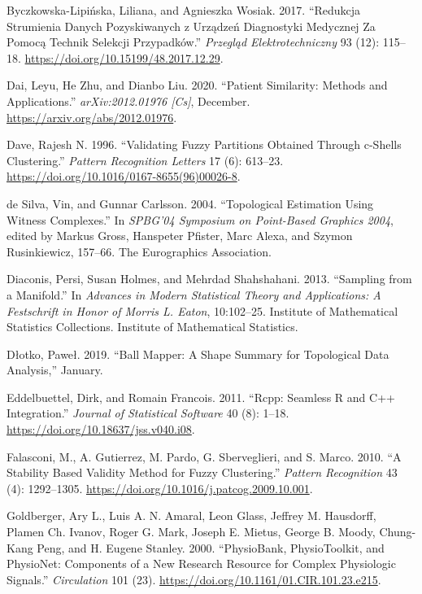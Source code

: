 \documentclass{article}
\newlength{\cslhangindent}
\newlength{\cslentryspacingunit} %
\newenvironment{CSLReferences}[2] %
 {%
  \setlength{\parindent}{0pt}
  \ifodd #1
  \let\oldpar\par
  \def\par{\hangindent=\cslhangindent\oldpar}
  \fi
  \setlength{\parskip}{#2\cslentryspacingunit}
 }%
 {}
\begin{document}
\begin{CSLReferences}{1}{0}
\leavevmode{}%
Byczkowska-Lipińska, Liliana, and Agnieszka Wosiak. 2017. {``Redukcja
Strumienia Danych Pozyskiwanych z Urządzeń Diagnostyki Medycznej Za
Pomocą Technik Selekcji Przypadków.''} \emph{Przegląd Elektrotechniczny}
93 (12): 115--18. \url{https://doi.org/10.15199/48.2017.12.29}.

\leavevmode{}%
Dai, Leyu, He Zhu, and Dianbo Liu. 2020. {``Patient Similarity: Methods
and Applications.''} \emph{arXiv:2012.01976 {[}Cs{]}}, December.
\url{https://arxiv.org/abs/2012.01976}.

\leavevmode{}%
Dave, Rajesh N. 1996. {``Validating Fuzzy Partitions Obtained Through
c-Shells Clustering.''} \emph{Pattern Recognition Letters} 17 (6):
613--23. \url{https://doi.org/10.1016/0167-8655(96)00026-8}.

\leavevmode{}%
de Silva, Vin, and Gunnar Carlsson. 2004. {``Topological Estimation
Using Witness Complexes.''} In \emph{{SPBG}'04 {Symposium} on
{Point-Based Graphics} 2004}, edited by Markus Gross, Hanspeter Pfister,
Marc Alexa, and Szymon Rusinkiewicz, 157--66. {The Eurographics
Association}.

\leavevmode{}%
Diaconis, Persi, Susan Holmes, and Mehrdad Shahshahani. 2013.
{``Sampling from a {Manifold}.''} In \emph{Advances in {Modern
Statistical Theory} and {Applications}: {A Festschrift} in Honor of
{Morris L}. {Eaton}}, 10:102--25. Institute of {Mathematical Statistics
Collections}. {Institute of Mathematical Statistics}.

\leavevmode{}%
Dłotko, Paweł. 2019. {``Ball Mapper: A Shape Summary for Topological
Data Analysis,''} January.

\leavevmode{}%
Eddelbuettel, Dirk, and Romain Francois. 2011. {``Rcpp: {Seamless R} and
{C}++ {Integration}.''} \emph{Journal of Statistical Software} 40 (8):
1--18. \url{https://doi.org/10.18637/jss.v040.i08}.

\leavevmode{}%
Falasconi, M., A. Gutierrez, M. Pardo, G. Sberveglieri, and S. Marco.
2010. {``A Stability Based Validity Method for Fuzzy Clustering.''}
\emph{Pattern Recognition} 43 (4): 1292--1305.
\url{https://doi.org/10.1016/j.patcog.2009.10.001}.

\leavevmode{}%
Goldberger, Ary L., Luis A. N. Amaral, Leon Glass, Jeffrey M. Hausdorff,
Plamen Ch. Ivanov, Roger G. Mark, Joseph E. Mietus, George B. Moody,
Chung-Kang Peng, and H. Eugene Stanley. 2000. {``{PhysioBank},
{PhysioToolkit}, and {PhysioNet}: {Components} of a {New Research
Resource} for {Complex Physiologic Signals}.''} \emph{Circulation} 101
(23). \url{https://doi.org/10.1161/01.CIR.101.23.e215}.


\end{CSLReferences}
\end{document}
